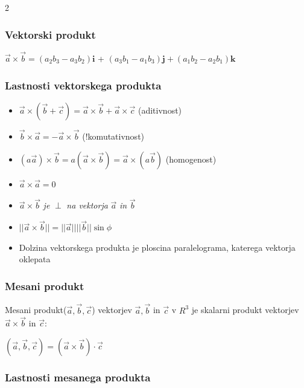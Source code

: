 \documentclass{article}
\begin{document}
\begin{multicols}{2}
	\subsubsection{Vektorski produkt}


	\begin{center}
		$\vec{a} \times \vec{b} = (a_{2}b_{3} - a_{3}b_{2}) \textbf{i}$ +
		$(a_{3}b_{1} - a_{1}b_{3}) \textbf{j} + (a_{1}b_{2} - a_{2}b_{1}) \textbf{k}$
	\end{center}

	\subsubsection{Lastnosti vektorskega produkta}

	\begin{itemize}
		\item $\vec{a} \times (\vec{b} + \vec{c}) = \vec{a} \times \vec{b} + \vec{a} \times \vec{c}$ (aditivnost)
		\item $\vec{b} \times \vec{a} = -\vec{a} \times \vec{b}$ (!komutativnost)
		\item $ (a \vec{a}) \times \vec{b} = a(\vec{a} \times \vec{b}) =  \vec{a} \times (a \vec{b})$ (homogenost)
		\item $\vec{a} \times \vec{a} = 0$
		\item $\vec{a} \times \vec{b}$  \textit{je}  $\perp$ \textit{na vektorja} $\vec{a}$ \textit{in} $\vec{b}$
		\item $||\vec{a} \times \vec{b}|| = ||\vec{a}|| ||\vec{b}|| \sin \phi$
		\item Dolzina vektorskega produkta je ploscina paralelograma, katerega vektorja oklepata
	\end{itemize}

	\subsubsection{Mesani produkt}

	Mesani produkt($\vec{a}, \vec{b}, \vec{c}$) vektorjev
	$\vec{a}, \vec{b}$ in $\vec{c}$ v $R^{3}$ je skalarni produkt vektorjev
	$\vec{a} \times \vec{b}$ in $\vec{c}$:
	\begin{center}
		$(\vec{a}, \vec{b}, \vec{c}) = (\vec{a} \times \vec{b})\cdot \vec{c}$
	\end{center}

	\subsubsection{Lastnosti mesanega produkta}


\end{multicols}
\end{document}
